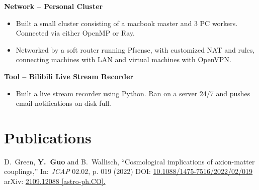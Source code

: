 \documentclass[letterpaper,12pt]{article}
\newenvironment{zitemize}{
\begin{itemize} \vspace{-.9em}\itemsep 0pt \parskip 0pt}
{\end{itemize}\vspace{-.5em}}
\begin{document}
\textbf{Network -- Personal Cluster}
\begin{zitemize}
    \item Built a small cluster consisting of a macbook master and 3 PC workers. Connected via either OpenMP or Ray.
    \item Networked by a soft router running Pfsense, with customized NAT and rules, connecting machines with LAN and virtual machines with OpenVPN.
\end{zitemize}

\textbf{Tool -- Bilibili Live Stream Recorder}
\begin{zitemize}
    \item Built a live stream recorder using Python. Ran on a server 24/7 and pushes email notifications on disk full.
\end{zitemize}



\section{Publications}

D.~Green, \textbf{Y.~Guo} and B.~Wallisch,
``Cosmological implications of axion-matter couplings,''
In: \textit{JCAP} 02.02, p. 019 (2022)
DOI: \href{https://iopscience.iop.org/article/10.1088/1475-7516/2022/02/019}{10.1088/1475-7516/2022/02/019}
arXiv: \href{https://arxiv.org/abs/2109.12088?context=hep-ph}{2109.12088 [astro-ph.CO].}
\end{document}

